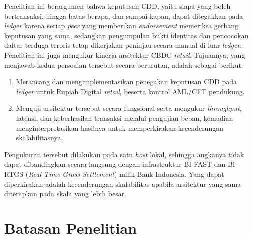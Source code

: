 Penelitian ini berargumen bahwa keputusan CDD, yaitu siapa yang boleh bertransaksi, hingga batas berapa, dan sampai kapan, dapat ditegakkan pada \textit{ledger} karena setiap \textit{peer} yang memberikan \textit{endorsement} memeriksa gerbang keputusan yang sama, sedangkan pengumpulan bukti identitas dan pencocokan daftar terduga teroris tetap dikerjakan peninjau secara manual di luar \textit{ledger}. Penelitian ini juga mengukur kinerja arsitektur CBDC \textit{retail}. Tujuannya, yang menjawab kedua persoalan tersebut secara berurutan, adalah sebagai berikut.
\begin{enumerate}
	\item Merancang dan mengimplementasikan penegakan keputusan CDD pada \textit{ledger} untuk Rupiah Digital \textit{retail}, beserta kontrol AML/CFT pendukung.
	\item Menguji arsitektur tersebut secara fungsional serta mengukur \textit{throughput}, latensi, dan keberhasilan transaksi melalui pengujian beban, kemudian menginterpretasikan hasilnya untuk memperkirakan kecenderungan skalabilitasnya.
\end{enumerate}

Pengukuran tersebut dilakukan pada satu \textit{host} lokal, sehingga angkanya tidak dapat dibandingkan secara langsung dengan infrastruktur BI-FAST dan BI-RTGS (\textit{Real Time Gross Settlement}) milik Bank Indonesia. Yang dapat diperkirakan adalah kecenderungan skalabilitas apabila arsitektur yang sama diterapkan pada skala yang lebih besar.

\section{Batasan Penelitian}

